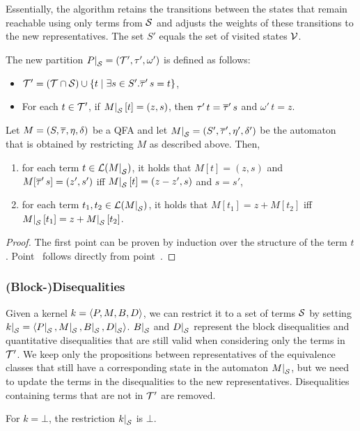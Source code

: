 Essentially, the algorithm retains the transitions between the states that remain reachable using only terms from $\mathcal{S}$ and adjusts the weights of these transitions to the new representatives.
The set $S'$ equals the set of visited states $\mathcal{V}$.

The new partition $\restr{P}{\Set} = (\T', \tau', \omega')$ is defined as follows:
\begin{itemize}
    \item $\mathcal{T}' = (\mathcal{T} \cap \mathcal{S}) \cup \{t \mid \exists s \in S' . \overline{\tau}'\,s = t\}$,
    \item For each $t \in \mathcal{T}'$, if $\restr{M}{\Set}[t] = (z, s)$, then $\tau'\,t = \overline{\tau}'\,s$ and $\omega'\,t = z$.
\end{itemize}

\begin{theorem}\label{restriction}
    Let $M = (S, \overline{\tau}, \eta, \delta)$ be a QFA and let $\restr{M}{\Set} = (S', \otau', \eta', \delta')$ be the automaton that is obtained by restricting $M$ as described above.
    Then,
    \begin{enumerate}
        \item\label{item:lemma-restriction} for each term $t \in \L(\restr{M}{\Set})$, it holds that $M[t] = (z, s)$ and $M[\overline{\tau}'\,s] = (z', s')$ iff $\restr{M}{\Set}[t] = (z - z', s)$ and $s = s'$,
        \item\label{item:correctness-restriction} for each term $t_1, t_2 \in \L(\restr{M}{\Set})$, it holds that $M[t_1] = z + M[t_2]$ iff $\restr{M}{\Set}[t_1] = z + \restr{M}{\Set}[t_2]$.
    \end{enumerate}
\end{theorem}
\begin{proof}
    The first point can be proven by induction over the structure of the term $t$.
    Point~ follows directly from point~.
\end{proof}

\subsubsection{(Block-)Disequalities}
Given a kernel $k = \langle P, M, B, D\rangle$, we can restrict it to a set of terms $\mathcal{S}$ by setting $\restr{k}{\Set} = \angl{\restr{P}{\Set}, \restr{M}{\Set}, \restr{B}{\Set}, \restr{D}{\Set}}$.
$\restr{B}{\Set}$ and $\restr{D}{\Set}$ represent the block disequalities and quantitative disequalities that are still valid when considering only the terms in $\mathcal{T}'$.
We keep only the propositions between representatives of the equivalence classes that
still have a corresponding state in the automaton $\restr{M}{\Set}$, but we need to update the terms in the disequalities to the new representatives.
Disequalities containing terms that are not in $\mathcal{T}'$ are removed.

For $k = \bot$, the restriction $\restr{k}{\Set}$ is $\bot$.
